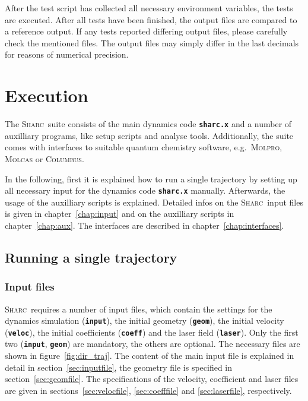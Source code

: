 \documentclass[a4paper,11pt,DIV=15,openany,twoside=false]{scrbook}
\newcommand{\sharc}{\textsc{Sharc}}
\newcommand{\ttt}[1]{\textbf{\texttt{#1}}}
\begin{document}
After the test script has collected all necessary environment variables, the tests are executed. After all tests have been finished, the output files are compared to a reference output. If any tests reported differing output files, please carefully check the mentioned files. The output files may simply differ in the last decimals for reasons of numerical precision. 


\chapter{Execution}

The \sharc\ suite consists of the main dynamics code \ttt{sharc.x} and a number of auxilliary programs, like setup scripts and analyse tools. Additionally, the suite comes with interfaces to suitable quantum chemistry software, e.g.\ \textsc{Molpro}, \textsc{Molcas} or \textsc{Columbus}. 

In the following, first it is explained how to run a single trajectory by setting up all necessary input for the dynamics code \ttt{sharc.x} manually. Afterwards, the usage of the auxilliary scripts is explained. Detailed infos on the \sharc\ input files is given in chapter~\ref{chap:input} and on the auxilliary scripts in chapter~\ref{chap:aux}. The interfaces are described in chapter~\ref{chap:interfaces}.

\section{Running a single trajectory}

\subsection{Input files}

\sharc\ requires a number of input files, which contain the settings for the dynamics simulation (\ttt{input}), the initial geometry (\ttt{geom}), the initial velocity (\ttt{veloc}), the initial coefficients (\ttt{coeff}) and the laser field (\ttt{laser}). Only the first two (\ttt{input}, \ttt{geom}) are mandatory, the others are optional. The necessary files are shown in figure~\ref{fig:dir_traj}. 
The content of the main input file is explained in detail in section~\ref{sec:inputfile}, the geometry file is specified in section~\ref{sec:geomfile}. The specifications of the velocity, coefficient and laser files are given in sections~\ref{sec:velocfile}, \ref{sec:coefffile} and \ref{sec:laserfile}, respectively.
\end{document}
